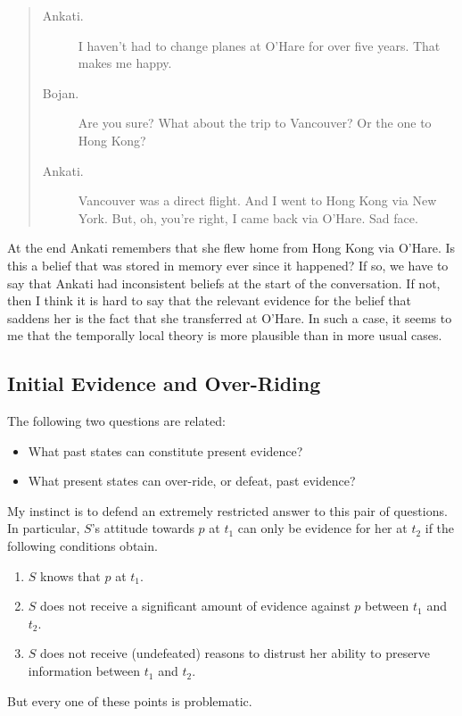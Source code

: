 \begin{quote}

\begin{description}

\item[Ankati.]

I haven't had to change planes at O'Hare for over five years. That makes me happy.

\item[Bojan.]

Are you sure? What about the trip to Vancouver? Or the one to Hong Kong?

\item[Ankati.]

Vancouver was a direct flight. And I went to Hong Kong via New York. But, oh, you're right, I came back via O'Hare. Sad face.
\end{description}
\end{quote}
At the end Ankati remembers that she flew home from Hong Kong via O'Hare. Is this a belief that was stored in memory ever since it happened? If so, we have to say that Ankati had inconsistent beliefs at the start of the conversation. If not, then I think it is hard to say that the relevant evidence for the belief that saddens her is the fact that she transferred at O'Hare. In such a case, it seems to me that the temporally local theory is more plausible than in more usual cases.

\subsection{Initial Evidence and Over-Riding}
\label{initialevidenceandover-riding}

The following two questions are related:

\begin{itemize}
\item What past states can constitute present evidence?

\item What present states can over-ride, or defeat, past evidence?

\end{itemize}
My instinct is to defend an extremely restricted answer to this pair of questions. In particular, $S$'s attitude towards $p$ at $t_1$ can only be evidence for her at $t_2$ if the following conditions obtain.

\begin{enumerate}
\item $S$ knows that $p$ at $t_1$.

\item $S$ does not receive a significant amount of evidence against $p$ between $t_1$ and $t_2$.

\item $S$ does not receive (undefeated) reasons to distrust her ability to preserve information between $t_1$ and $t_2$.

\end{enumerate}
But every one of these points is problematic.


